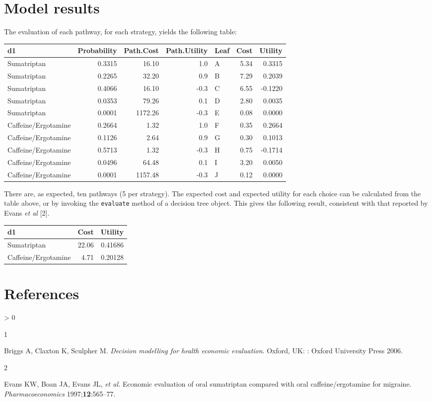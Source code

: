 \documentclass[
]{article}
\newlength{\cslhangindent}
\newlength{\csllabelwidth}
\newenvironment{CSLReferences}[2] %
 {%
  \setlength{\parindent}{0pt}
  \ifodd #1 \everypar{\setlength{\hangindent}{\cslhangindent}}\ignorespaces\fi
  \ifnum #2 > 0
  \setlength{\parskip}{#2\baselineskip}
  \fi
 }%
 {}
\newcommand{\CSLLeftMargin}[1]{\parbox[t]{\csllabelwidth}{#1}}
\newcommand{\CSLRightInline}[1]{\parbox[t]{\linewidth - \csllabelwidth}{#1}\break}
\begin{document}
\hypertarget{model-results}{%
\section{Model results}\label{model-results}}

The evaluation of each pathway, for each strategy, yields the following
table:

\begin{longtable}[]{@{}lrrrlrr@{}}
\toprule
d1 & Probability & Path.Cost & Path.Utility & Leaf & Cost &
Utility\tabularnewline
\midrule
\endhead
Sumatriptan & 0.3315 & 16.10 & 1.0 & A & 5.34 & 0.3315\tabularnewline
Sumatriptan & 0.2265 & 32.20 & 0.9 & B & 7.29 & 0.2039\tabularnewline
Sumatriptan & 0.4066 & 16.10 & -0.3 & C & 6.55 & -0.1220\tabularnewline
Sumatriptan & 0.0353 & 79.26 & 0.1 & D & 2.80 & 0.0035\tabularnewline
Sumatriptan & 0.0001 & 1172.26 & -0.3 & E & 0.08 & 0.0000\tabularnewline
Caffeine/Ergotamine & 0.2664 & 1.32 & 1.0 & F & 0.35 &
0.2664\tabularnewline
Caffeine/Ergotamine & 0.1126 & 2.64 & 0.9 & G & 0.30 &
0.1013\tabularnewline
Caffeine/Ergotamine & 0.5713 & 1.32 & -0.3 & H & 0.75 &
-0.1714\tabularnewline
Caffeine/Ergotamine & 0.0496 & 64.48 & 0.1 & I & 3.20 &
0.0050\tabularnewline
Caffeine/Ergotamine & 0.0001 & 1157.48 & -0.3 & J & 0.12 &
0.0000\tabularnewline
\bottomrule
\end{longtable}

There are, as expected, ten pathways (5 per strategy). The expected cost
and expected utility for each choice can be calculated from the table
above, or by invoking the \texttt{evaluate} method of a decision tree
object. This gives the following result, consistent with that reported
by Evans \emph{et al} {[}2{]}.

\begin{longtable}[]{@{}lrr@{}}
\toprule
d1 & Cost & Utility\tabularnewline
\midrule
\endhead
Sumatriptan & 22.06 & 0.41686\tabularnewline
Caffeine/Ergotamine & 4.71 & 0.20128\tabularnewline
\bottomrule
\end{longtable}

\hypertarget{references}{%
\section*{References}\label{references}}

\hypertarget{refs}{}
\begin{CSLReferences}{0}{0}
\leavevmode\hypertarget{ref-briggs:2002a}{}%
\CSLLeftMargin{1 }
\CSLRightInline{Briggs A, Claxton K, Sculpher M. \emph{Decision
modelling for health economic evaluation}. Oxford, UK: : Oxford
University Press 2006. }

\leavevmode\hypertarget{ref-evans:1997a}{}%
\CSLLeftMargin{2 }
\CSLRightInline{Evans KW, Boan JA, Evans JL, \emph{et al.} Economic
evaluation of oral sumatriptan compared with oral caffeine/ergotamine
for migraine. \emph{Pharmacoeconomics} 1997;\textbf{12}:565--77.}

\end{CSLReferences}
\end{document}
